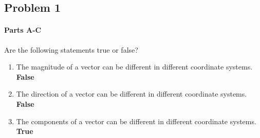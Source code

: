 
\subsection{Problem 1}

\setcounter{partcounter}{3}
\paragraph{Parts A-C}

Are the following statements true or false?

\begin{enumerate}[label=\Alph*.]
	\item The magnitude of a vector can be different in different coordinate systems. \textbf{False}
	\item The direction of a vector can be different in different coordinate systems. \textbf{False}
	\item The components of a vector can be different in different coordinate systems. \textbf{True}
\end{enumerate}
